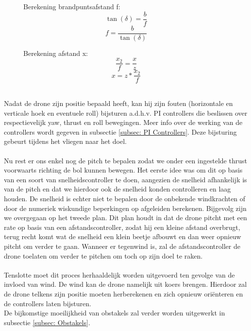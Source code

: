\begin{figure}[h]
	\centering
	\begin{minipage}{.5\textwidth}
		Berekening brandpuntsafstand f:
		\begin{equation} \label{eq:RelatieveVerticaleHoekBegin}
		\tan(\delta) = \frac{b}{f}
		\end{equation}
		\begin{equation} 
		f = \frac{b}{\tan(\delta)}
		\end{equation}
	\end{minipage}
	\begin{minipage}{.45\textwidth}
		Berekening afstand x:
		\begin{equation} 
		\frac{x_2}{f} = \frac{x}{z}
		\end{equation}
		\begin{equation} \label{eq:RelatieveVerticaleHoekEind}
		x = z * \frac{x_2}{f}	
		\end{equation}
	\end{minipage}%
\end{figure}
\\
Nadat de drone zijn positie bepaald heeft, kan hij zijn fouten (horizontale en verticale hoek en eventuele roll) bijsturen a.d.h.v. PI controllers die beslissen over respectievelijk yaw, thrust en roll bewegingen. Meer info over de werking van de controllers wordt gegeven in subsectie \ref{subsec: PI Controllers}. Deze bijsturing gebeurt tijdens het vliegen naar het doel. 
\\
\\
Nu rest er ons enkel nog de pitch te bepalen zodat we onder een ingestelde thrust voorwaarts richting de bol kunnen bewegen. Het eerste idee was om dit op basis van een soort van snelheidscontroller te doen, aangezien de snelheid afhankelijk is van de pitch en dat we hierdoor ook de snelheid konden controlleren en laag houden. De snelheid is echter niet te bepalen door de onbekende windkrachten of door de numeriek wiskundige beperkingen op afgeleiden berekenen. Bijgevolg zijn we overgegaan op het tweede plan. Dit plan houdt in dat de drone pitcht met een rate op basis van een afstandscontroller, zodat hij een kleine afstand overbrugt, terug recht komt wat de snelheid een klein beetje afbouwt en dan weer opnieuw pitcht om verder te gaan. Wanneer er tegenwind is, zal de afstandscontroller de drone toelaten om verder te pitchen om toch op zijn doel te raken.
\\
\\
Tenslotte moet dit proces herhaaldelijk worden uitgevoerd ten gevolge van de invloed van wind. De wind kan de drone namelijk uit koers brengen. Hierdoor zal de drone telkens zijn positie moeten herberekenen en zich opnieuw ori\"enteren en de controllers laten bijsturen.
\\
De bijkomstige moeilijkheid van obstakels zal verder worden uitgewerkt in subsectie \ref{subsec: Obstakels}.